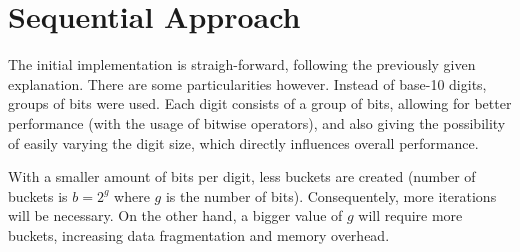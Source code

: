 \section{Sequential Approach}
\label{sec:300}

The initial implementation is straigh-forward, following the previously given explanation. There are some particularities however. Instead of base-10 digits, groups of bits were used. Each digit consists of a group of bits, allowing for better performance (with the usage of bitwise operators), and also giving the possibility of easily varying the digit size, which directly influences overall performance.

With a smaller amount of bits per digit, less buckets are created (number of buckets is $b=2^g$ where $g$ is the number of bits). Consequentely, more iterations will be necessary. On the other hand, a bigger value of $g$ will require more buckets, increasing data fragmentation and memory overhead.